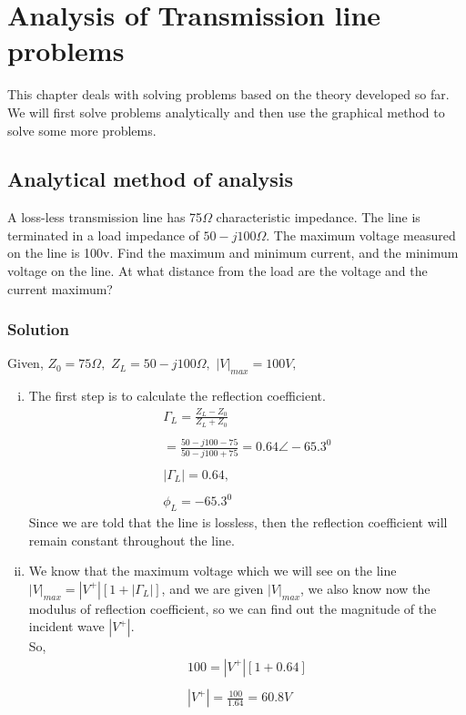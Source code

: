\chapter{Analysis of Transmission line problems}
This chapter deals with solving problems based on the theory developed so far. We will first solve problems analytically and then use the graphical method to solve some more problems.

\section{\textbf{Analytical method of analysis}}
\begin{example}
A loss-less transmission line has 75$\Omega$ characteristic impedance. The line is terminated in a load impedance of $50-j100\Omega$. The maximum voltage measured on the line is 100v. Find the maximum and minimum current, and the minimum voltage on the line. At what distance from the load are the voltage and the current maximum?
\subsection*{Solution}
Given,
$Z_{0}=75\Omega,$
$Z_{L}=50-j100\Omega,$
$|V|_{max}=100V,$

\begin{enumerate}[(i)]
\item 
The first step is to calculate the reflection coefficient.
\begin{align*}
\Gamma_{L}=\frac{Z_{L}-Z_{0}}{Z_{L}+Z_{0}}\\\\
=\frac{50-j100-75}{50-j100+75}=0.64\angle-65.3^{0} \\\\
|\Gamma_{L}|=0.64,\\\\ \phi_{L}=-65.3^{0}
\end{align*}
Since we are told that the line is lossless, then the reflection coefficient will remain constant throughout the line.

\item We know that the maximum voltage which we will see on the line $|V|_{max}=|V^{+}|[1+|\Gamma_{L}|]$, and we are given $|V|_{max}$, we also know now the modulus of reflection coefficient, so we can find out the magnitude of the incident wave $|V^+|$.\\
So,
\begin{align*}
100=|V^{+}|[1+0.64]\\\\
|V^{+}|=\frac{100}{1.64}=60.8V
\end{align*}


\end{enumerate}
\end{example}
